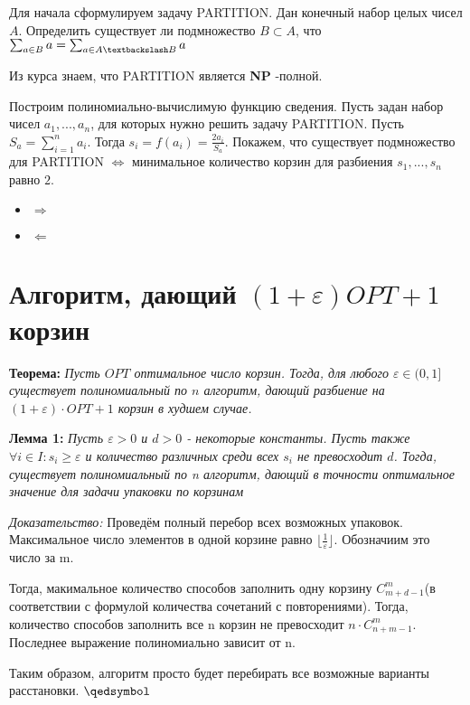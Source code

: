 \documentclass[a4paper,14pt,russian]{article}
\begin{document}
Для начала сформулируем задачу PARTITION. Дан конечный набор целых чисел $A$. Определить существует ли подмножество $B \subset A$, что $\sum_{a \in B} a = \sum_{a \in {A \textbackslash B}} a$

Из курса знаем, что PARTITION является {\bf NP} -полной. 

Построим полиномиально-вычислимую функцию сведения. Пусть задан набор чисел $a_1, ..., a_n$, для которых нужно решить задачу  PARTITION. Пусть $S_a = \sum_{i=1}^n a_i$. Тогда $s_i = f(a_i) = \frac{2a_i}{S_a}$. Покажем, что существует подмножество для PARTITION $\Leftrightarrow$ минимальное количество корзин для разбиения $s_1, ..., s_n$ равно $2$.

\begin{itemize}
  \item $\Rightarrow$
  \item $\Leftarrow$
\end{itemize}






\newpage
\section {Алгоритм, дающий $(1 + \varepsilon)OPT + 1$ корзин}

{\bf Теорема:} \textit{Пусть $OPT$ оптимальное число корзин. Тогда, для любого $\varepsilon \in (0, 1]$ существует полиномиальный по $n$ алгоритм, дающий разбиение на $(1 + \varepsilon) \cdot OPT + 1$ корзин в худшем случае.}

{\bf Лемма 1:} \textit{Пусть $\varepsilon > 0$ и $d > 0$ - некоторые константы. Пусть также $\forall i \in I: s_i \geq \varepsilon$ и количество различных среди всех $s_i$ не превосходит $d$. Тогда, существует полиномиальный по n алгоритм, дающий в точности оптимальное значение для задачи упаковки по корзинам}

\textit{Доказательство:} Проведём полный перебор всех возможных упаковок. Максимальное число элементов в одной корзине равно $\lfloor{\frac{1}{\varepsilon}\rfloor}$. Обозначиим это число за m. 

Тогда, макимальное количество способов заполнить одну корзину $C_{m+d-1}^{m}$(в соответствии с формулой количества сочетаний с повторениями). Тогда, количество способов заполнить все n корзин не превосходит $n \cdot C_{n+m-1}^{m}$. Последнее выражение полиномиально зависит от n.

Таким образом, алгоритм просто будет перебирать все возможные варианты расстановки.
$\qedsymbol$
\end{document}
